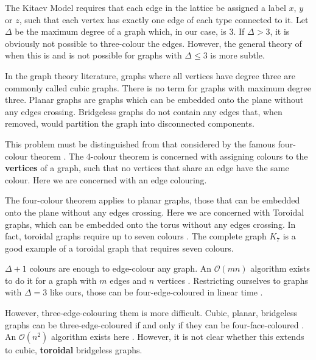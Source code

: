 The Kitaev Model requires that each edge in the lattice be assigned a label \(x\), \(y\) or \(z\), such that each vertex has exactly one edge of each type connected to it. Let \(\Delta\) be the maximum degree of a graph which, in our case, is 3. If \(\Delta > 3\), it is obviously not possible to three-colour the edges. However, the general theory of when this is and is not possible for graphs with \(\Delta \leq 3\) is more subtle.

In the graph theory literature, graphs where all vertices have degree three are commonly called cubic graphs. There is no term for graphs with maximum degree three. Planar graphs are graphs which can be embedded onto the plane without any edges crossing. Bridgeless graphs do not contain any edges that, when removed, would partition the graph into disconnected components.

This problem must be distinguished from that considered by the famous four-colour theorem \autocite{appelEveryPlanarMap1989}. The 4-colour theorem is concerned with assigning colours to the \textbf{vertices} of a graph, such that no vertices that share an edge have the same colour. Here we are concerned with an edge colouring.

The four-colour theorem applies to planar graphs, those that can be embedded onto the plane without any edges crossing. Here we are concerned with Toroidal graphs, which can be embedded onto the torus without any edges crossing. In fact, toroidal graphs require up to seven colours \autocite{heawoodMapColouringTheorems}. The complete graph \(K_7\) is a good example of a toroidal graph that requires seven colours.

\(\Delta + 1\) colours are enough to edge-colour any graph. An \(\mathcal{O}(mn)\) algorithm exists to do it for a graph with \(m\) edges and \(n\) vertices \autocite{gEstimateChromaticClass1964}. Restricting ourselves to graphs with \(\Delta = 3\) like ours, those can be four-edge-coloured in linear time \autocite{skulrattanakulchai4edgecoloringGraphsMaximum2002}.

However, three-edge-colouring them is more difficult. Cubic, planar, bridgeless graphs can be three-edge-coloured if and only if they can be four-face-coloured \autocite{tait1880remarks}. An \(\mathcal{O}(n^2)\) algorithm exists here \autocite{robertson1996efficiently}. However, it is not clear whether this extends to cubic, \textbf{toroidal} bridgeless graphs.

